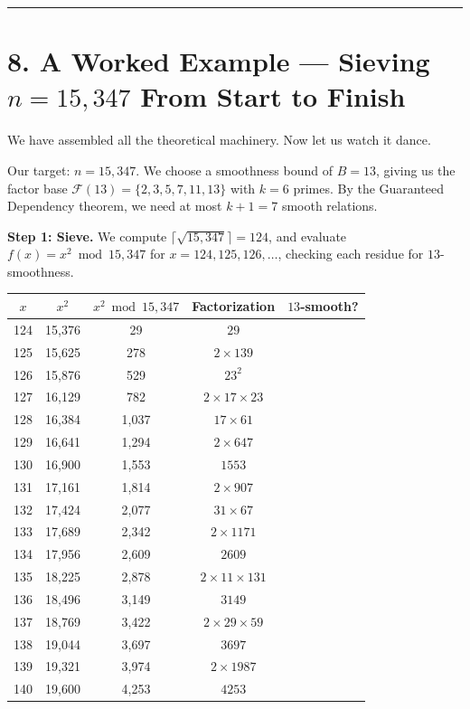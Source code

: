 \documentclass[11pt,openany]{book}
\theoremstyle{definition}
\theoremstyle{plain}
\theoremstyle{remark}
\begin{document}
\bigskip\noindent\rule{\textwidth}{0.4pt}\bigskip


\section{8. A Worked Example — Sieving $n = 15{,}347$ From Start to Finish}


We have assembled all the theoretical machinery. Now let us watch it dance.

Our target: $n = 15{,}347$. We choose a smoothness bound of $B = 13$, giving us the factor base $\mathcal{F}(13) = \{2, 3, 5, 7, 11, 13\}$ with $k = 6$ primes. By the Guaranteed Dependency theorem, we need at most $k + 1 = 7$ smooth relations.

\textbf{Step 1: Sieve.} We compute $\lceil \sqrt{15{,}347} \rceil = 124$, and evaluate $f(x) = x^2 \bmod 15{,}347$ for $x = 124, 125, 126, \ldots$, checking each residue for $13$-smoothness.

\begin{center}
\begin{tabular}{c|c|c|c|c}
\toprule
$x$ & $x^2$ & $x^2 \bmod 15{,}347$ & Factorization & $13$-smooth? \\
\midrule
124 & 15,376 & 29 & $29$ &  \\
125 & 15,625 & 278 & $2 \times 139$ &  \\
126 & 15,876 & 529 & $23^2$ &  \\
127 & 16,129 & 782 & $2 \times 17 \times 23$ &  \\
128 & 16,384 & 1,037 & $17 \times 61$ &  \\
129 & 16,641 & 1,294 & $2 \times 647$ &  \\
130 & 16,900 & 1,553 & $1553$ &  \\
131 & 17,161 & 1,814 & $2 \times 907$ &  \\
132 & 17,424 & 2,077 & $31 \times 67$ &  \\
133 & 17,689 & 2,342 & $2 \times 1171$ &  \\
134 & 17,956 & 2,609 & $2609$ &  \\
135 & 18,225 & 2,878 & $2 \times 11 \times 131$ &  \\
136 & 18,496 & 3,149 & $3149$ &  \\
137 & 18,769 & 3,422 & $2 \times 29 \times 59$ &  \\
138 & 19,044 & 3,697 & $3697$ &  \\
139 & 19,321 & 3,974 & $2 \times 1987$ &  \\
140 & 19,600 & 4,253 & $4253$ &  \\
\bottomrule
\end{tabular}
\end{center}
\end{document}
